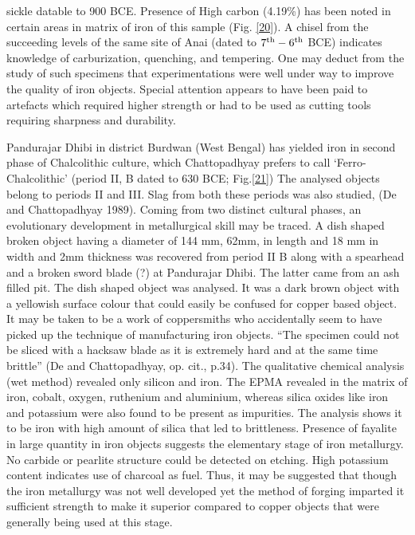 sickle datable to 900 BCE. Presence of High carbon (4.19\%) has been noted in certain areas in matrix of iron of this sample (Fig. \ref{20}).  A chisel from the succeeding levels of the same site of Anai (dated to $7^{\rm th}-6^{\rm th}$ BCE) indicates knowledge of carburization, quenching, and tempering. One may deduct from  the study of such specimens that experimentations were well under way to improve the quality of iron objects. Special attention appears to have been paid to artefacts which required higher strength or had to be used as cutting tools requiring sharpness and durability. 
 
Pandurajar Dhibi in district Burdwan (West Bengal) has yielded iron in second phase of Chalcolithic culture, which Chattopadhyay prefers to call ‘Ferro-Chalcolithic’ (period II, B dated to 630 BCE; Fig.\ref{21})  The analysed objects belong to periods II and III. Slag from both these periods was also studied, (De and Chattopadhyay 1989). Coming from two distinct cultural phases, an evolutionary development in metallurgical skill may be traced. A dish shaped broken object having a diameter of 144 mm, 62mm, in length and 18 mm in width and 2mm thickness was recovered from period II B along with a spearhead and a broken sword blade (?) at Pandurajar Dhibi. The latter came from an ash filled pit. The dish shaped object was analysed. It was a dark brown object with a yellowish surface colour that could easily be confused for copper based object. It may be taken to be a work of coppersmiths who accidentally seem to have picked up the technique of manufacturing iron objects. “The specimen could not be sliced with a hacksaw blade as it is extremely hard and at the same time brittle” (De and Chattopadhyay, op. cit., p.34). The qualitative chemical analysis (wet method) revealed only silicon and iron. The EPMA revealed in the matrix of iron, cobalt, oxygen, ruthenium and aluminium, whereas silica oxides like iron and potassium were also found to be present as impurities. The analysis shows it to be iron with high amount of silica that led to brittleness. Presence of fayalite in large quantity in iron objects suggests the elementary stage of iron metallurgy. No carbide or pearlite structure could be detected on etching. High potassium content indicates use of charcoal as fuel. Thus, it may be suggested that though the iron metallurgy was not well developed yet the method of forging imparted it sufficient strength to make it superior compared to copper objects that were generally being used at this stage.

